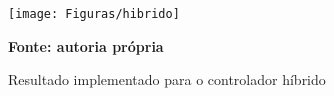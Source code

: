 \begin{figure}[ht]
\centering
\caption{Resultado implementado para o controlador híbrido}
\label{fig:resultadoImplementadoHibrido}
		\centering
		\texttt{[image: Figuras/hibrido]}%

	\textbf{Fonte: autoria própria}
\end{figure}